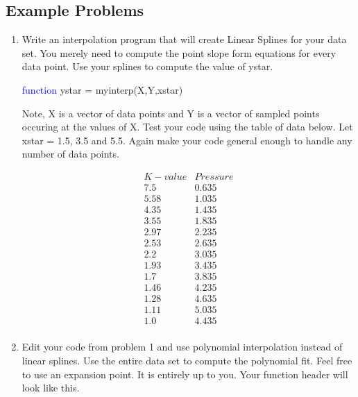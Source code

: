 \subsection{Example Problems}

\begin{enumerate}

\item Write an interpolation program that will create Linear Splines
  for your data set. You merely need to compute the point slope form
  equations for every data point. Use your splines to compute the
  value of ystar. 

  \begin{framed}
    \textcolor{blue}{function} ystar = myinterp(X,Y,xstar)
  \end{framed}

  Note, X is a vector of data points and Y is a vector of sampled
  points occuring at the values of X. Test your code using the
  table of data below. Let xstar = 1.5, 3.5 and 5.5. Again make your
  code general enough to handle any number of data points. 

  \begin{equation}\nonumber
    \begin{matrix}
      K-value & Pressure \\
      7.5 & 0.635\\
      5.58 & 1.035\\
      4.35 & 1.435\\
      3.55 & 1.835\\
      2.97 & 2.235\\
      2.53 & 2.635\\
      2.2 & 3.035\\
      1.93 & 3.435\\
      1.7 & 3.835\\
      1.46 & 4.235\\
      1.28 & 4.635\\
      1.11 & 5.035\\
      1.0 & 4.435\\
    \end{matrix}
  \end{equation}

\item Edit your code from problem 1 and use polynomial
  interpolation instead of linear splines. Use the entire data set to
  compute the polynomial fit. Feel free to use an expansion point. It
  is entirely up to you. Your function header will look like this. 


\end{enumerate}
